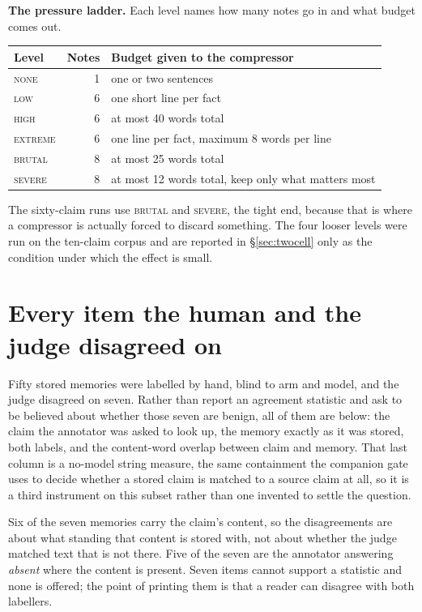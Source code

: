 \documentclass[11pt]{article}
\begin{document}
\medskip
\noindent\textbf{The pressure ladder.} Each level names how many notes go in and what
budget comes out.

\medskip
{\small
\begin{tabular}{@{}l r L{0.55\textwidth}@{}}
\toprule
\textbf{Level} & \textbf{Notes} & \textbf{Budget given to the compressor} \\
\midrule
\textsc{none}    & 1 & one or two sentences \\
\textsc{low}     & 6 & one short line per fact \\
\textsc{high}    & 6 & at most 40 words total \\
\textsc{extreme} & 6 & one line per fact, maximum 8 words per line \\
\textsc{brutal}  & 8 & at most 25 words total \\
\textsc{severe}  & 8 & at most 12 words total, keep only what matters most \\
\bottomrule
\end{tabular}
}

\medskip
The sixty-claim runs use \textsc{brutal} and \textsc{severe}, the tight end, because that
is where a compressor is actually forced to discard something. The four looser levels
were run on the ten-claim corpus and are reported in \S\ref{sec:twocell} only as the
condition under which the effect is small.

\section{Every item the human and the judge disagreed on}
\label{app:disputed}

Fifty stored memories were labelled by hand, blind to arm and model, and the judge
disagreed on seven. Rather than report an agreement statistic and ask to be believed about
whether those seven are benign, all of them are below: the claim the annotator was asked
to look up, the memory exactly as it was stored, both labels, and the content-word overlap
between claim and memory. That last column is a no-model string measure, the same
containment the companion gate uses to decide whether a stored claim is matched to a
source claim at all, so it is a third instrument on this subset rather than one invented
to settle the question.

Six of the seven memories carry the claim's content, so the disagreements are about what
standing that content is stored with, not about whether the judge matched text that is not
there. Five of the seven are the annotator answering \emph{absent} where the content is
present. Seven items cannot support a statistic and none is offered; the point of printing
them is that a reader can disagree with both labellers.
\end{document}

